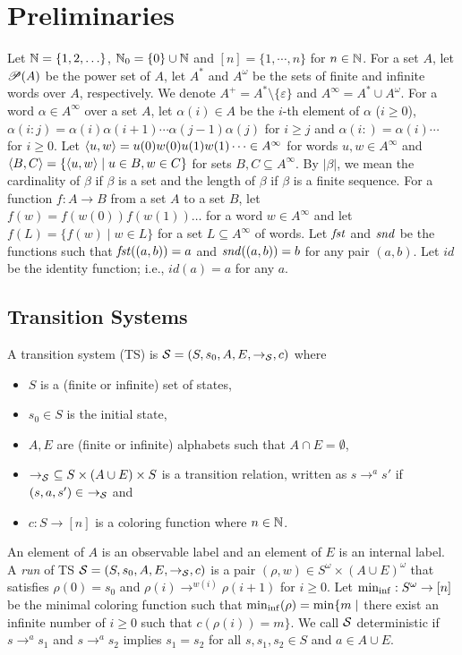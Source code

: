 \section{Preliminaries}
Let $\mathbb{N}=\{1,2,\ldots\}$, $\mathbb{N}_0=\{0\} \cup \mathbb{N}$ and $[n]=\{1,\cdots,n\}$ for $n\in\mathbb{N}$.
For a set $A$, let $\mathscr{P}(A)$ be the power set of $A$,
let $A^*$ and $A^\omega$ be the sets of finite and infinite words over $A$, respectively.
We denote $A^+ = A^*\setminus\{\varepsilon\}$ and
$A^\infty = A^* \cup A^\omega$.
For a word $\alpha\in A^\infty$ over a set $A$,
let $\alpha(i)\in A$ be the $i$-th element of $\alpha$ ($i\geq 0$),
$\alpha(i:j)=\alpha(i)\alpha(i+1)\cdots\alpha(j-1)\alpha(j)$ for $i\geq j$
and $\alpha(i:)=\alpha(i)\cdots$ for $i\geq 0$.
Let $\langle u, w\rangle = u(0)w(0)u(1)w(1)\cdots \in A^\infty$ for words $u,w\in A^\infty$ and $\langle B, C\rangle = \{\langle u, w\rangle\mid u\in B, w\in C\}$ for sets $B, C\subseteq A^\infty$.
By $|\beta|$, we mean the cardinality of $\beta$ if $\beta$ is a set
and the length of $\beta$ if $\beta$ is a finite sequence.
For a function $f:A\to B$ from a set $A$ to a set $B$,
let $f(w)=f(w(0))f(w(1))\ldots$ for a word $w\in A^{\infty}$
and let $f(L)=\{f(w)\mid w\in L\}$ for a set $L\subseteq A^{\infty}$
of words.
Let $\mathit{fst}$ and $\mathit{snd}$ be the functions such that $\mathit{fst}((a,b))=a$ and $\mathit{snd}((a,b))=b$ for any pair $(a,b)$.
Let $\mathit{id}$ be the identity function; i.e.,
$\mathit{id}(a)=a$ for any $a$.

\subsection{Transition Systems}
\begin{definition}
A {transition system} (TS)
is ${\cal S}=(S, s_0, A, E, \to_{\cal S}, c)$ where
\begin{itemize}
\item $S$ is a (finite or infinite) set of states,
\item $s_0\in S$ is the initial state,
\item $A, E$ are (finite or infinite) alphabets such that $A\cap E = \emptyset$,
\item $\to_{\cal S}\ \subseteq S\times(A\cup E)\times S$ is a transition relation, written as $s\to^a s'$ if $(s,a,s')\in\ \to_{\cal S}$ and
\item $c: S \to [n]$ is a coloring function where $n\in \mathbb{N}$.
\end{itemize}
\end{definition}
An element of $A$ is an observable label and an element of $E$ is an internal label.
A \emph{run} of TS ${\cal S}=(S, s_0, A, E, \to_{\cal S}, c)$ is
a pair $(\rho, w)\in S^\omega \times (A\cup E)^\omega$ that satisfies
$\rho(0)=s_0$ and $\rho(i)\to^{w(i)}\rho(i+1)$ for $i\geq 0$.
Let ${\rm min_{inf}}: S^\omega \to [n]$ be the minimal coloring function such that
${\rm min_{inf}}(\rho)={\rm min}\{m\mid$ there exist an infinite number of $i\geq 0$ such that $c(\rho(i)) = m\}$.
We call ${\cal S}$ deterministic if $s\to^a s_1$ and $s\to^a s_2$ implies $s_1=s_2$ for all $s,s_1,s_2\in S$ and $a\in A\cup E$.

